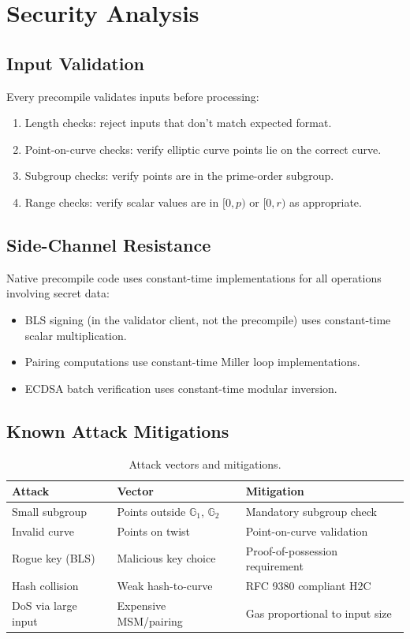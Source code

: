 \section{Security Analysis}
\label{sec:security}

\subsection{Input Validation}

Every precompile validates inputs before processing:
\begin{enumerate}
    \item Length checks: reject inputs that don't match expected format.
    \item Point-on-curve checks: verify elliptic curve points lie on the correct curve.
    \item Subgroup checks: verify points are in the prime-order subgroup.
    \item Range checks: verify scalar values are in $[0, p)$ or $[0, r)$ as appropriate.
\end{enumerate}

\subsection{Side-Channel Resistance}

Native precompile code uses constant-time implementations for all operations involving secret data:
\begin{itemize}
    \item BLS signing (in the validator client, not the precompile) uses constant-time scalar multiplication.
    \item Pairing computations use constant-time Miller loop implementations.
    \item ECDSA batch verification uses constant-time modular inversion.
\end{itemize}

\subsection{Known Attack Mitigations}

\begin{table}[H]
\centering
\caption{Attack vectors and mitigations.}
\label{tab:attacks}
\begin{tabular}{p{3.5cm}p{4cm}p{5cm}}
\toprule
\textbf{Attack} & \textbf{Vector} & \textbf{Mitigation} \\
\midrule
Small subgroup & Points outside $\mathbb{G}_1$, $\mathbb{G}_2$ & Mandatory subgroup check \\
Invalid curve & Points on twist & Point-on-curve validation \\
Rogue key (BLS) & Malicious key choice & Proof-of-possession requirement \\
Hash collision & Weak hash-to-curve & RFC 9380 compliant H2C \\
DoS via large input & Expensive MSM/pairing & Gas proportional to input size \\
\bottomrule
\end{tabular}
\end{table}

